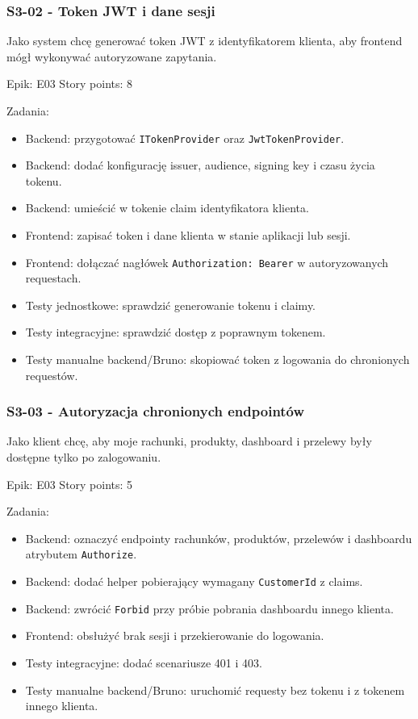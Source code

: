 \documentclass[12pt,a4paper]{article}
\begin{document}
\subsubsection*{S3-02 - Token JWT i dane sesji}

Jako system chcę generować token JWT z identyfikatorem klienta, aby frontend mógł wykonywać autoryzowane zapytania.

Epik: E03
Story points: 8

Zadania:

\begin{itemize}
\item Backend: przygotować \texttt{ITokenProvider} oraz \texttt{JwtTokenProvider}.
\item Backend: dodać konfigurację issuer, audience, signing key i czasu życia tokenu.
\item Backend: umieścić w tokenie claim identyfikatora klienta.
\item Frontend: zapisać token i dane klienta w stanie aplikacji lub sesji.
\item Frontend: dołączać nagłówek \texttt{Authorization: Bearer} w autoryzowanych requestach.
\item Testy jednostkowe: sprawdzić generowanie tokenu i claimy.
\item Testy integracyjne: sprawdzić dostęp z poprawnym tokenem.
\item Testy manualne backend/Bruno: skopiować token z logowania do chronionych requestów.
\end{itemize}

\subsubsection*{S3-03 - Autoryzacja chronionych endpointów}

Jako klient chcę, aby moje rachunki, produkty, dashboard i przelewy były dostępne tylko po zalogowaniu.

Epik: E03
Story points: 5

Zadania:

\begin{itemize}
\item Backend: oznaczyć endpointy rachunków, produktów, przelewów i dashboardu atrybutem \texttt{Authorize}.
\item Backend: dodać helper pobierający wymagany \texttt{CustomerId} z claims.
\item Backend: zwrócić \texttt{Forbid} przy próbie pobrania dashboardu innego klienta.
\item Frontend: obsłużyć brak sesji i przekierowanie do logowania.
\item Testy integracyjne: dodać scenariusze 401 i 403.
\item Testy manualne backend/Bruno: uruchomić requesty bez tokenu i z tokenem innego klienta.
\end{itemize}
\end{document}
